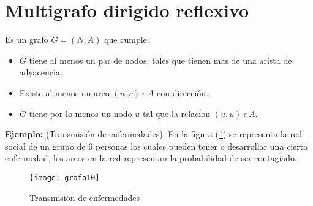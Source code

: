 \documentclass[a4paper, 11pt]{article}
\begin{document}

\section*{Multigrafo dirigido reflexivo }


Es un grafo $G = (N, A)$ que cumple:
\begin{itemize}
\item $G$ tiene al menos un par de nodos, tales que tienen mas de una arista de adyacencia.
\item Existe al menos un arco $(u, v) \ \epsilon \ A$ con dirección.
\item $G$ tiene por lo menos un nodo $u$ tal que la relacion $(u, u) \ \epsilon \ A$.
\end{itemize}


\textbf{Ejemplo:} (Transmisión de enfermedades). En la figura (\ref{imagen12}) se representa la red social de un grupo de 6 personas los cuales pueden tener o desarrollar una cierta enfermedad, los arcos en la red representan la probabilidad de ser contagiado.


\begin{figure}[H]
  \centering
    \texttt{[image: grafo10]}
  \caption{Transmisión de enfermedades}
  \label{imagen12}
\end{figure}



\nocite{*}
\end{document}
